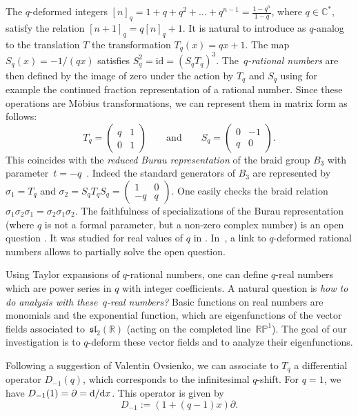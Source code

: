 \documentclass[pdftex]{sigma}
\numberwithin{equation}{section}
\newcommand*{\R}{\mathbb{R}}
\newcommand*{\C}{\mathbb{C}}
\begin{document}
The $q$-deformed integers $[n]_q=1+q+q^2+\dots +q^{n-1}=\frac{1-q^n}{1-q}$, where $q\in \C^*$, satisfy the relation $[n+1]_q=q[n]_q+1$. It is natural to introduce as $q$-analog to the translation $T$ the transformation $T_q(x)=qx+1$. The map $S_q(x)=-1/(qx)$ satisfies $S_q^2=\mathrm{id}=(S_qT_q)^3$. The~\emph{$q$-rational numbers} are then defined by the image of zero under the action by $T_q$ and $S_q$ using for example the continued fraction representation of a rational number. Since these operations are M\"obius transformations, we can represent them in matrix form as follows:
\[
T_q=\begin{pmatrix} q&1\\ 0 & 1 \end{pmatrix}\qquad \text{and}\qquad S_q=\begin{pmatrix} 0&-1\\ q & 0 \end{pmatrix}.
\]
This coincides with the \emph{reduced Burau representation} of the braid group $B_3$ with parameter~${t=-q}$~\cite{burau}. Indeed the standard generators of $B_3$ are represented by $\sigma_1=T_q$ and $\sigma_2=S_qT_qS_q=\left(\begin{smallmatrix}1 & 0 \\ -q & q\end{smallmatrix}\right)$. One easily checks the braid relation $\sigma_1\sigma_2\sigma_1=\sigma_2\sigma_1\sigma_2$. The faithfulness of specializations of the Burau representation (where $q$ is not a formal parameter, but a non-zero complex number) is an open question \cite[Section 7]{bharathram2021burau}. It was studied for real values of $q$ in \cite{scherich2020classification}. In~\cite{morier2023}, a link to $q$-deformed rational numbers allows to partially solve the open question.

Using Taylor expansions of $q$-rational numbers, one can define $q$-real numbers \cite{morier2022q} which are power series in $q$ with integer coefficients. A natural question is \emph{how to do analysis with these~$q$-real numbers?} Basic functions on real numbers are monomials and the exponential function, which are eigenfunctions of the vector fields associated to~$\mathfrak{sl}_2(\R)$ \big(acting on the completed line~$\mathbb{RP}^1$\big). The goal of our investigation is to $q$-deform these vector fields and to analyze their eigenfunctions.

Following a suggestion of Valentin Ovsienko, we can associate to $T_q$ a differential operator $D_{-1}(q)$, which corresponds to the infinitesimal $q$-shift. For $q = 1$, we have ${D_{-1}(1)=\partial={\rm d}/{\rm d}x}$. This operator is given by
\[
D_{-1}:=(1+(q-1)x)\partial.
\]
\end{document}
